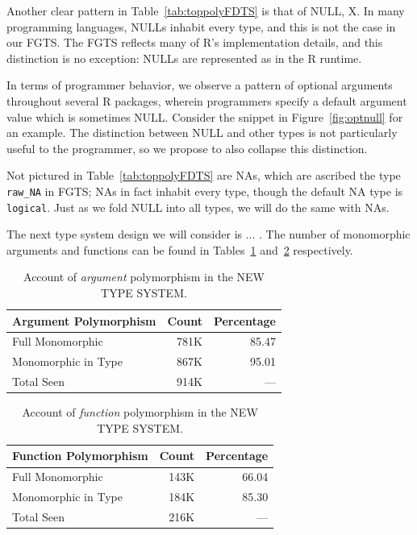 \documentclass[acmsmall,10pt,review,anonymous]{acmart}\settopmatter{printfolios=true,printccs=false,printacmref=false}
\begin{document}
Another clear pattern in Table~\ref{tab:toppolyFDTS} is that of NULL, X.
In many programming languages, NULLs inhabit every type, and this is not the case in our FGTS.
The FGTS reflects many of R's implementation details, and this distinction is no exception:
NULLs are represented as  in the R runtime.

In terms of programmer behavior, we observe a pattern of optional arguments throughout several R packages, wherein programmers specify a default argument value which is sometimes NULL.
Consider the snippet in Figure~\ref{fig:optnull} for an example.
The distinction between NULL and other types is not particularly useful to the programmer, so we propose to also collapse this distinction.

Not pictured in Table~\ref{tab:toppolyFDTS} are NAs, which are ascribed the type {\tt raw\_NA} in FGTS; NAs in fact inhabit every type, though the default NA type is {\tt logical}.
Just as we fold NULL into all types, we will do the same with NAs.

The next type system design we will consider is ... .
The number of monomorphic arguments and functions can be found in Tables~\ref{tab:argcountsWHATTS} and~\ref{tab:funcountsWHATTS} respectively.

\begin{table}[ht]
\label{tab:argcountsWHATTS}
\centering
\begin{tabular}{lrr}
  \hline
 Argument Polymorphism & Count & Percentage \\ 
  \hline
  Full Monomorphic & 781K & 85.47 \\
  Monomorphic in Type & 867K & 95.01 \\
  Total Seen & 914K & --- \\ 
     \hline
\end{tabular}
\caption{Account of {\it argument} polymorphism in the NEW TYPE SYSTEM.}
\end{table}

\begin{table}[ht]
\label{tab:funcountsWHATTS}
\centering
\begin{tabular}{lrr}
  \hline
 Function Polymorphism & Count & Percentage \\ 
  \hline
  Full Monomorphic & 143K & 66.04 \\ 
  Monomorphic in Type & 184K & 85.30 \\
  Total Seen & 216K & --- \\ 
   \hline
\end{tabular}
\caption{Account of {\it function} polymorphism in the NEW TYPE SYSTEM.}
\end{table}
\end{document}
